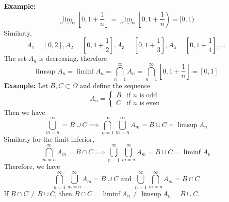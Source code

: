 \documentclass[openany]{report}
\begin{document}
\textbf{Example:}
\[\lim_{n\rightarrow\infty} \left[0, 1 + \frac{1}{n}\right] = \lim_{n\rightarrow\infty} \left[0, 1 + \frac{1}{n}\right) = [0,1)\]
Similarly,
\[A_1 = [0,2], A_2 = \left[0,1 + \frac{1}{2}\right], A_3 = \left[0,1 + \frac{1}{3}\right],A_4 = \left[0,1 + \frac{1}{4}\right], \ldots \]
The set $A_n$ is decreasing, therefore
\[\limsup A_n = \liminf A_n =\bigcap_{n=1}^\infty A_n = \bigcap_{n=1}^\infty \left[0, 1 + \frac{1}{n}\right] = [0,1]\]
\noindent
\textbf{Example:} Let $B, C \subset \Omega$ and define the sequence 
\[A_n = \begin{cases}
    B & \text{if } n \text{ is odd}\\
    C & \text{if } n \text{ is even}
\end{cases}\]
Then we have 
\[\bigcup_{m=n}^\infty = B \cup C \implies \bigcap_{n=1}^\infty \bigcup_{m=n}^\infty A_m = B \cup C = \limsup A_n\]
Similarly for the limit inferior, 
\[\bigcap_{m=n}^\infty A_m = B \cap C \implies \bigcup_{n=1}^\infty \bigcup_{m=n}^\infty A_m = B \cup C = \liminf A_n\]
Therefore, we have 
\[\bigcap_{n=1}^\infty \bigcup_{m=n}^\infty A_m = B \cup C \text{ and } \bigcup_{n=1}^\infty \bigcap_{m=n}^\infty A_m = B \cap C\]
If $B \cap C \neq B \cup C$, then $B \cap C = \liminf A_n \neq \limsup A_n = B \cup C$. 
\end{document}
